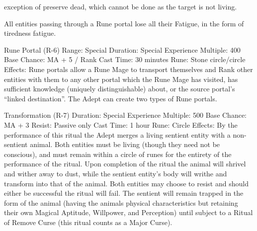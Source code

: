 \documentclass[a4paper]{article}
\begin{document}
\begin{multicols}{3}
exception of preserve dead, which cannot be done
as the target is not living.

All entities passing through a Rune portal lose all
their Fatigue, in the form of tiredness fatigue.

Rune Portal (R-6)
Range: Special
Duration: Special
Experience Multiple: 400
Base Chance: MA + 5 / Rank
Cast Time: 30 minutes
Rune: Stone circle/circle
Effects: Rune portals allow a Rune Mage to transport themselves and Rank other entities with them
to any other portal which the Rune Mage has visited, has sufficient knowledge (uniquely distinguishable) about, or the source portal’s “linked
destination”. The Adept can create two types of
Rune portals.

Transformation (R-7)
Duration: Special
Experience Multiple: 500
Base Chance: MA + 3%
Resist: Passive only
Cast Time: 1 hour
Rune: Circle
Effects: By the performance of this ritual the Adept
merges a living sentient entity with a non-sentient
animal. Both entities must be living (though they
need not be conscious), and must remain within a
circle of runes for the entirety of the performance
of the ritual. Upon completion of the ritual the
animal will shrivel and wither away to dust, while
the sentient entity’s body will writhe and transform
into that of the animal. Both entities may choose to
resist and should either be successful the ritual will
fail. The sentient will remain trapped in the form of
the animal (having the animals physical characteristics but retaining their own Magical Aptitude,
Willpower, and Perception) until subject to a Ritual
of Remove Curse (this ritual counts as a Major
Curse).


\end{multicols}
\end{document}
